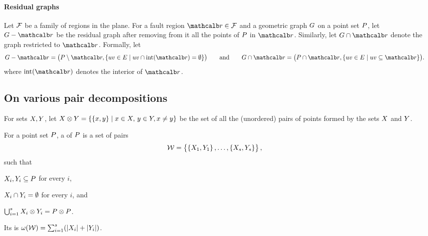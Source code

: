 \documentclass[12pt]{article}%
\begin{document}
\paragraph{Residual graphs}

Let $\mathcal{F}$ be a family of regions in the plane. For a fault region
$\region \in \FF$ and a geometric graph $G$ on a point set $P$, let
$\G \gminus \region$ be the residual graph after removing from it all
the points of $P$ in $\region$. Similarly, let
$\restrictY{\G}{\region}$ denote the graph restricted to $\region$.
Formally, let
\begin{equation*}
    \G \gminus \region%
    =%
    \bigl( \PS \setminus \region, \Set{ uv \in \EG }{ uv \cap
       \interiorX{\region} = \emptyset} \bigr)
    \qquad\text{and}\qquad%
    \restrictY{\G}{\region}%
    =%
    \bigl( \PS \cap {\region},
    \Set{uv \in \EG}{ uv \subseteq {\region} } \bigr).
\end{equation*}
where $\interiorX{\region}$ denotes the interior of $\region$.


\subsection{On various pair decompositions}

For sets $X, Y$, let
\begin{math}
    \PSX \otimes \PSY%
    =%
    \Set{\brc{\px,\py}}{ \px\in \PSX,\, \py\in \PSY, \px \ne \py }
\end{math}
be the set of all the (unordered) pairs of points formed by the sets
$X$ and $Y$.

\begin{defn}
    For a point set $P$, a  of $P$ is a set of pairs
    \begin{equation*}
        \mathcal{W} = \left\{ {\bigl. \left\{ {X_1,Y_1} \right\},\ldots,\left\{ {X_s,Y_s} \right\}} \right\},
    \end{equation*}
    such that
    \begin{enumerate*}[label=(\Roman*)]
        \item $X_i,Y_i\subseteq P$ for every $i$,
        \item $X_i \cap Y_i = \emptyset$ for every $i$, and
        \item
        $\bigcup_{i=1}^s X_i \otimes Y_i = P \otimes P$.
    \end{enumerate*}
    Its  is
    $\WeightX{\WS} = \sum_{i=1}^s \pth{ \cardin{\PSX_i } +
       \cardin{\PSY_i}}$.
\end{defn}
\end{document}
